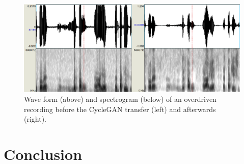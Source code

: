 \documentclass[runningheads,a4paper]{llncs}
\begin{document}
\begin{figure}[htpb]
\includegraphics[scale=0.4]{rc/overdrive.eps}
\caption{Wave form (above) and spectrogram (below) of an overdriven recording
before the CycleGAN transfer (left) and afterwards (right).}
\label{fig:overdrive}
\end{figure}

%
%
%
%
%

\section{Conclusion}
\end{document}
